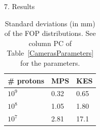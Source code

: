 \documentclass[final]{beamer} %
\newcommand{\mc}[3]{\multicolumn{#1}{#2}{#3}}
\newcommand{\tcr}[1]{\textcolor{red}{#1}}
\begin{document}
\begin{frame}{}
\begin{columns}[t]
\begin{column}{0.49\textwidth}
\begin{block}{7. Results}
				
			{}
			\begin{table}[h]
			\centering
			\begin{tabular}{lll}
				\midrule
				\# protons 						& MPS & KES  \\
				\midrule
				$10^9$ & 0.32 & 0.65 \\
				$10^8$    				& 1.05 & 1.80 \\
				$10^7$    				& 2.81 & 17.1 \\
				\midrule
			\end{tabular}
			\caption{Standard deviations (in mm) of the FOP distributions. See column PC of Table~\ref{CamerasParameters} for the parameters.}
			\label{FRPCOMP}
			\end{table}					
		\end{block}


\end{column}
\end{columns}
\end{frame}
\end{document}
